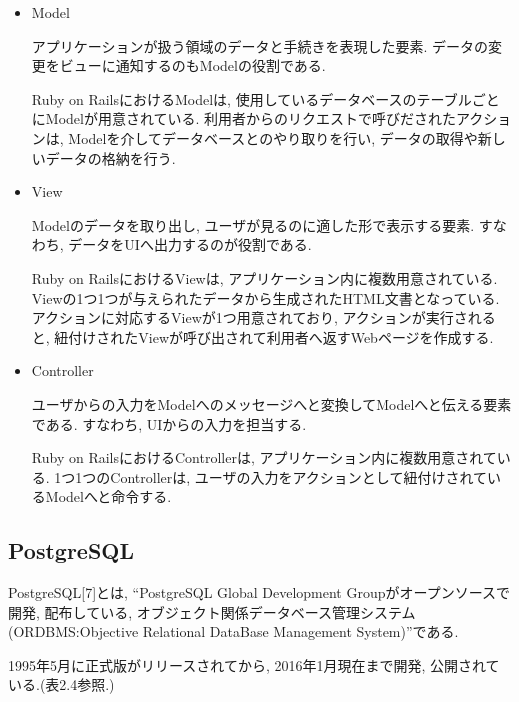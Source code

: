 \begin{itemize}
\item Model

アプリケーションが扱う領域のデータと手続きを表現した要素.
データの変更をビューに通知するのもModelの役割である.

Ruby on RailsにおけるModelは, 使用しているデータベースのテーブルごとにModelが用意されている.
利用者からのリクエストで呼びだされたアクションは, Modelを介してデータベースとのやり取りを行い, データの取得や新しいデータの格納を行う.

\item View

Modelのデータを取り出し, ユーザが見るのに適した形で表示する要素.
すなわち, データをUIへ出力するのが役割である.

Ruby on RailsにおけるViewは, アプリケーション内に複数用意されている.
Viewの1つ1つが与えられたデータから生成されたHTML文書となっている.
アクションに対応するViewが1つ用意されており, アクションが実行されると, 紐付けされたViewが呼び出されて利用者へ返すWebページを作成する.

\item Controller

ユーザからの入力をModelへのメッセージへと変換してModelへと伝える要素である.
すなわち, UIからの入力を担当する.

Ruby on RailsにおけるControllerは, アプリケーション内に複数用意されている.
1つ1つのControllerは, ユーザの入力をアクションとして紐付けされているModelへと命令する.

\end{itemize}

\subsection{PostgreSQL}
PostgreSQL[7]とは, “PostgreSQL Global Development Groupがオープンソースで開発, 配布している, オブジェクト関係データベース管理システム(ORDBMS:Objective Relational DataBase Management System)”である.

1995年5月に正式版がリリースされてから, 2016年1月現在まで開発, 公開されている.(表2.4参照.)

